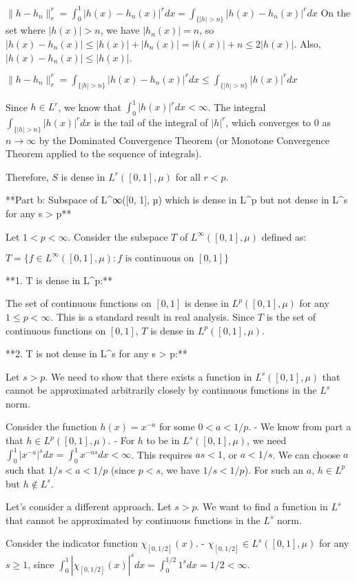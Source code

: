 $\|h - h_n\|_r^r = \int_0^1 |h(x) - h_n(x)|^r dx = \int_{\{|h| > n\}} |h(x) - h_n(x)|^r dx$
On the set where $|h(x)| > n$, we have $|h_n(x)| = n$, so $|h(x) - h_n(x)| \le |h(x)| + |h_n(x)| = |h(x)| + n \le 2|h(x)|$.
Also, $|h(x) - h_n(x)| \le |h(x)|$.

$\|h - h_n\|_r^r = \int_{\{|h| > n\}} |h(x) - h_n(x)|^r dx \le \int_{\{|h| > n\}} |h(x)|^r dx$

Since $h \in L^r$, we know that $\int_0^1 |h(x)|^r dx < \infty$. The integral $\int_{\{|h| > n\}} |h(x)|^r dx$ is the tail of the integral of $|h|^r$, which converges to 0 as $n \to \infty$ by the Dominated Convergence Theorem (or Monotone Convergence Theorem applied to the sequence of integrals).

Therefore, $S$ is dense in $L^r([0, 1], \mu)$ for all $r < p$.

**Part b: Subspace of L^∞([0, 1], µ) which is dense in L^p but not dense in L^s for any s > p**

Let $1 < p < \infty$. Consider the subspace $T$ of $L^\infty([0, 1], \mu)$ defined as:

$T = \{f \in L^\infty([0, 1], \mu) : f \text{ is continuous on } [0, 1]\}$

**1. T is dense in L^p:**

The set of continuous functions on $[0, 1]$ is dense in $L^p([0, 1], \mu)$ for any $1 \le p < \infty$. This is a standard result in real analysis. Since $T$ is the set of continuous functions on $[0, 1]$, $T$ is dense in $L^p([0, 1], \mu)$.

**2. T is not dense in L^s for any s > p:**

Let $s > p$. We need to show that there exists a function in $L^s([0, 1], \mu)$ that cannot be approximated arbitrarily closely by continuous functions in the $L^s$ norm.

Consider the function $h(x) = x^{-a}$ for some $0 < a < 1/p$.
- We know from part a that $h \in L^p([0, 1], \mu)$.
- For $h$ to be in $L^s([0, 1], \mu)$, we need $\int_0^1 |x^{-a}|^s dx = \int_0^1 x^{-as} dx < \infty$. This requires $as < 1$, or $a < 1/s$.
We can choose $a$ such that $1/s < a < 1/p$ (since $p < s$, we have $1/s < 1/p$). For such an $a$, $h \in L^p$ but $h \notin L^s$.

Let's consider a different approach. Let $s > p$. We want to find a function in $L^s$ that cannot be approximated by continuous functions in the $L^s$ norm.

Consider the indicator function $\chi_{[0, 1/2]}(x)$.
- $\chi_{[0, 1/2]} \in L^s([0, 1], \mu)$ for any $s \ge 1$, since $\int_0^1 |\chi_{[0, 1/2]}(x)|^s dx = \int_0^{1/2} 1^s dx = 1/2 < \infty$.

